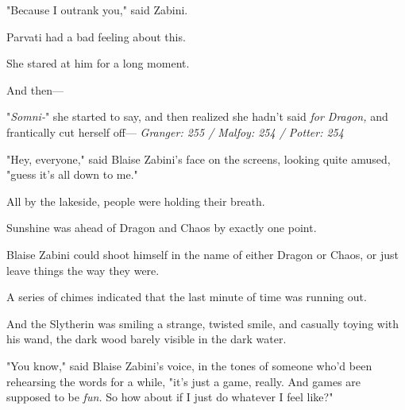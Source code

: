 "Because I outrank you," said Zabini.

Parvati had a bad feeling about this.

She stared at him for a long moment.

And then---

"\emph{Somni-}" she started to say, and then realized she hadn't said \emph{for 
Dragon,} and frantically cut herself off---
\sbreak
\emph{Granger: 255 / Malfoy: 254 / Potter: 254}

"Hey, everyone," said Blaise Zabini's face on the screens, looking quite 
amused, "guess it's all down to me."

All by the lakeside, people were holding their breath.

Sunshine was ahead of Dragon and Chaos by exactly one point.

Blaise Zabini could shoot himself in the name of either Dragon or Chaos, or 
just leave things the way they were.

A series of chimes indicated that the last minute of time was running out.

And the Slytherin was smiling a strange, twisted smile, and casually toying 
with his wand, the dark wood barely visible in the dark water.

"You know," said Blaise Zabini's voice, in the tones of someone who'd been 
rehearsing the words for a while, "it's just a game, really. And games are 
supposed to be \emph{fun.} So how about if I just do whatever I feel like?"
